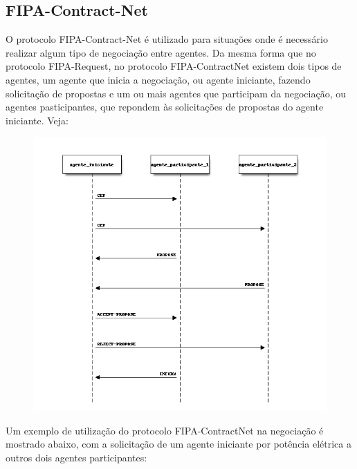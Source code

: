 \documentclass[letterpaper,10pt,brazil]{sphinxmanual}
\begin{document}
\subsection{FIPA-Contract-Net}
\label{user/protocolos:fipa-contract-net}\label{user/protocolos:id2}
O protocolo FIPA-Contract-Net é utilizado para situações onde é necessário realizar algum tipo de negociação entre agentes. Da mesma forma que no protocolo FIPA-Request, no protocolo FIPA-ContractNet existem dois tipos de agentes, um agente que inicia a negociação, ou agente iniciante, fazendo solicitação de propostas e um ou mais agentes que participam da negociação, ou agentes pasticipantes, que repondem às solicitações de propostas do agente iniciante. Veja:
\begin{figure}[htbp]
\centering

\includegraphics[width=4.5in]{seq_diag_contract.png}
\end{figure}

Um exemplo de utilização do protocolo FIPA-ContractNet na negociação é mostrado abaixo, com a solicitação de um agente iniciante por potência elétrica a outros dois agentes participantes:
\end{document}
